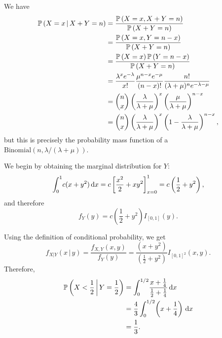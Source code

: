 \begin{ex}
  We have
  \begin{align*}
    \mathbb{P}\left(X=x\,\middle|\, X+Y=n\right)
     & =\frac{\mathbb{P}\left(X=x,X+Y=n\right)}{\mathbb{P}\left(X+Y=n\right)}                                                                               \\
     & =\frac{\mathbb{P}\left(X=x,Y=n-x\right)}{\mathbb{P}\left(X+Y=n\right)}                                                                               \\
     & =\frac{\mathbb{P}\left(X=x\right)\mathbb{P}\left(Y=n-x\right)}{\mathbb{P}\left(X+Y=n\right)}                                                                            \\
     & =\frac{\lambda^x e^{-\lambda}}{x!}\frac{\mu^{n-x} e^{-\mu}}{(n-x)!}\frac{n!}{(\lambda +\mu)^ne^{-\lambda-\mu}} \\
     & =\binom{n}{x}\left(\frac{\lambda}{\lambda+\mu}\right)^x\left(\frac{\mu}{\lambda+\mu} \right)^{n-x}             \\
     & =\binom{n}{x}\left(\frac{\lambda}{\lambda+\mu}\right)^x\left(1-\frac{\lambda}{\lambda+\mu} \right)^{n-x},
  \end{align*}
  but this is precisely the probability mass function of a
  $\text{Binomial}(n, \lambda/(\lambda+\mu))$.
\end{ex}

\begin{ex}
  We begin by obtaining the marginal distribution for $Y$:
  \[
    \int_0^1\! c(x+y^2)\,\mathrm{d}{x}
    =c\left[\frac{x^2}{2}+xy^2\right]_{x=0}^1
    =c\left(\frac{1}{2}+y^2\right),
  \]
  and therefore
  \[
    f_Y(y)=c\left(\frac{1}{2}+y^2\right)I_{[0,1]}(y).
  \]

  Using the definition of conditional probability, we get
  \[
    f_{X|Y}(x\,|\,y)
    =\frac{f_{X,Y}(x,y)}{f_Y(y)}
    =\frac{(x+y^2)}{\left(\frac{1}{2}+y^2\right)}I_{[0,1]^2}(x,y).
  \]
  Therefore,
  \begin{align*}
    \mathbb{P}\left(X<\frac{1}{2}\,\middle|\, Y=\frac{1}{2}\right)
     & =\int_0^{1/2}\!\frac{x+\frac{1}{4}}{\frac{1}{2}+\frac{1}{4}}\,\mathrm{d}{x} \\
     & =\frac{4}{3}\int_0^{1/2}\!\left(x+\frac{1}{4}\right)\,\mathrm{d}{x}         \\
     & =\frac{1}{3}.
  \end{align*}
\end{ex}

